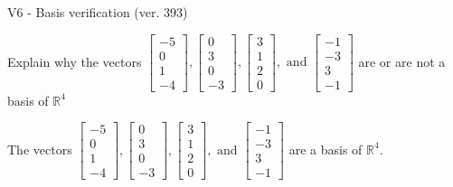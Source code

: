 \begin{exercise}
  \begin{exerciseTitle}V6 - Basis verification (ver. 393)\end{exerciseTitle}
  \begin{exerciseStatement}
    Explain why the vectors \(\left[\begin{array}{r}
-5 \\
0 \\
1 \\
-4
\end{array}\right] , \left[\begin{array}{r}
0 \\
3 \\
0 \\
-3
\end{array}\right] , \left[\begin{array}{r}
3 \\
1 \\
2 \\
0
\end{array}\right] , \text{ and } \left[\begin{array}{r}
-1 \\
-3 \\
3 \\
-1
\end{array}\right]\) are or are not a basis of \(\mathbb{R}^4\)	


  \end{exerciseStatement}
  \begin{exerciseAnswer}
   The vectors \(\left[\begin{array}{r}
-5 \\
0 \\
1 \\
-4
\end{array}\right] , \left[\begin{array}{r}
0 \\
3 \\
0 \\
-3
\end{array}\right] , \left[\begin{array}{r}
3 \\
1 \\
2 \\
0
\end{array}\right] , \text{ and } \left[\begin{array}{r}
-1 \\
-3 \\
3 \\
-1
\end{array}\right]\) 
  	 are  a basis of \(\mathbb{R}^4\).
  


  \end{exerciseAnswer}
\end{exercise}